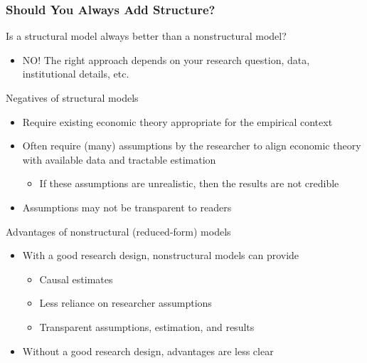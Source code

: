 \documentclass{beamer}
\begin{document}
\begin{frame}\frametitle{Should You Always Add Structure?}
    Is a structural model always better than a nonstructural model?
    \begin{itemize}
        \item NO! The right approach depends on your research question, data, institutional details, etc.
    \end{itemize}
    \vspace{2ex}
    Negatives of structural models
    \begin{itemize}
    	\item Require existing economic theory appropriate for the empirical context
    	\item Often require (many) assumptions by the researcher to align economic theory with available data and tractable estimation
    	\begin{itemize}
    		\item If these assumptions are unrealistic, then the results are not credible
    	\end{itemize}
    	\item Assumptions may not be transparent to readers
    \end{itemize}
    \vspace{2ex}
    Advantages of nonstructural (reduced-form) models
    \begin{itemize}
        \item With a good research design, nonstructural models can provide
        \begin{itemize}
            \item Causal estimates
            \item Less reliance on researcher assumptions
            \item Transparent assumptions, estimation, and results
        \end{itemize}
        \item Without a good research design, advantages are less clear
    \end{itemize}
\end{frame}
\end{document}
